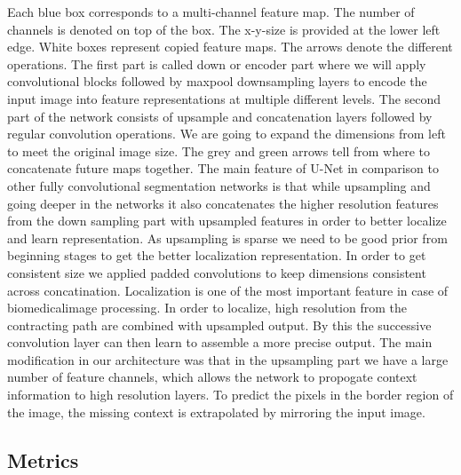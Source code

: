 Each blue box corresponds to a multi-channel feature map. The number of channels is denoted on top of the box. The x-y-size is provided at the lower left edge. White boxes represent copied feature maps. The arrows denote the different operations.\newline
The first part is called down or encoder part where we will apply convolutional blocks followed by maxpool downsampling layers to encode the input image into feature representations at multiple different levels. The second part of the network consists of upsample and concatenation layers followed by regular convolution operations. We are going to expand the dimensions from left to meet the original image size. The grey and green arrows tell from where to concatenate future maps together. The main feature of U-Net in comparison to other fully convolutional segmentation networks is that while upsampling and going deeper in the networks it also concatenates the higher resolution features from the down sampling part with upsampled features in order to better localize and learn representation.\newline
As upsampling is sparse we need to be good prior from beginning stages to get the better localization representation. In order to get consistent size we applied padded convolutions to keep dimensions consistent across concatination. Localization is one of the most important feature in case of biomedicalimage processing. In order to localize, high resolution from the contracting path are combined with upsampled output. By this the successive convolution layer can then learn to assemble a more precise output. The main modification in our architecture was that in the upsampling part we have a large number of feature channels, which allows the network to propogate context information to high resolution layers. To predict the pixels in the border region of the image, the missing context is extrapolated by mirroring the input image.

\subsection{Metrics}
